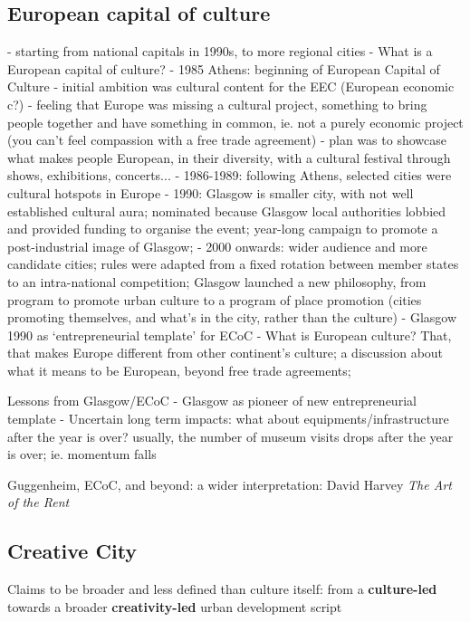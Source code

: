\documentclass{article}
\begin{document}
\subsection{European capital of culture}

- starting from national capitals in 1990s, to more regional cities
- What is a European capital of culture? 
- 1985 Athens: beginning of European Capital of Culture
	- initial ambition was cultural content for the EEC (European economic c?)
	- feeling that Europe was missing a cultural project, something to bring people together and have something in common, ie. not a purely economic project (you can't feel compassion with a free trade agreement)
	- plan was to showcase what makes people European, in their diversity, with a cultural festival through shows, exhibitions, concerts... 
	- 1986-1989: following Athens, selected cities were cultural hotspots in Europe
	- 1990: Glasgow is smaller city, with not well established cultural aura; nominated because Glasgow local authorities lobbied and provided funding to organise the event; year-long campaign to promote a post-industrial image of Glasgow; 
	- 2000 onwards: wider audience and more candidate cities; rules were adapted from a fixed rotation between member states to an intra-national competition; Glasgow launched a new philosophy, from program to promote urban culture to a program of place promotion (cities promoting themselves, and what's in the city, rather than the culture)
	- Glasgow 1990 as `entrepreneurial template' for ECoC
	- What is European culture? That, that makes Europe different from other continent's culture; a discussion about what it means to be European, beyond free trade agreements; 
	
Lessons from Glasgow/ECoC
	- Glasgow as pioneer of new entrepreneurial template
	- Uncertain long term impacts: what about equipments/infrastructure after the year is over? usually, the number of museum visits drops after the year is over; ie. momentum falls

Guggenheim, ECoC, and beyond: a wider interpretation: David Harvey \textit{The Art of the Rent}

\subsection{Creative City}

Claims to be broader and less defined than culture itself: from a \textbf{culture-led} towards a broader \textbf{creativity-led} urban development script
\end{document}
